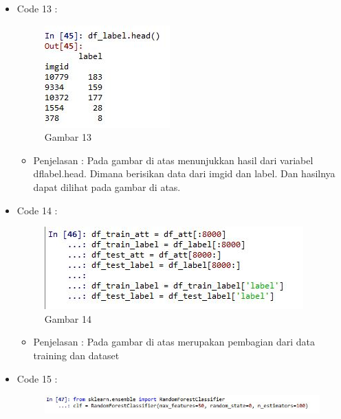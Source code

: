 \begin{enumerate}
\begin{itemize}
\begin{itemize}
\par
\par
\end{itemize}
\item Code 13 :
\par
\begin{figure}[ht]
\centering
\includegraphics[scale=0.7]{figures/pd13.jpg}
\caption{Gambar 13}
\label{contoh}
\end{figure}
\par
\begin{itemize}
\item Penjelasan : Pada gambar di atas menunjukkan hasil dari variabel dflabel.head. Dimana berisikan data dari imgid dan label. Dan hasilnya dapat dilihat pada gambar di atas.
\par
\par
\end{itemize}
\item Code 14 :
\par
\begin{figure}[ht]
\centering
\includegraphics[scale=0.7]{figures/pd14.jpg}
\caption{Gambar 14}
\label{contoh}
\end{figure}
\par
\begin{itemize}
\item Penjelasan : Pada gambar di atas merupakan pembagian dari data training dan dataset
\par
\par
\end{itemize}
\item Code 15 :
\par
\begin{figure}[ht] 
\centering
\includegraphics[scale=0.7]{figures/pd15.jpg}

\end{figure}
\end{itemize}
\end{enumerate}
